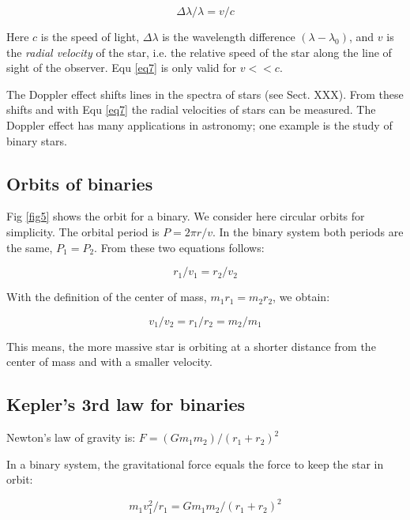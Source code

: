 \begin{equation}
\Delta\lambda / \lambda = v/c
\label{eq7}
\end{equation}

Here $c$ is the speed of light, $\Delta\lambda$ is the wavelength difference $(\lambda - \lambda_0)$, and $v$ is the \textit{radial velocity} of the star, i.e. the relative speed of the star along the line of sight of the observer. Equ \eqref{eq7} is only valid for $v<<c$.

The Doppler effect shifts lines in the spectra of stars (see Sect. XXX). From these shifts and with Equ \eqref{eq7} the radial velocities of stars can be measured. The Doppler effect has many applications in astronomy; one example is the study of binary stars.

\subsection{Orbits of binaries}

Fig \ref{fig5} shows the orbit for a binary. We consider here circular orbits for simplicity. The orbital period is $P = 2 \pi r / v$. In the binary system both periods are the same, $P_1 = P_2$. From these two equations follows:

\begin{equation}
r_1 / v_1 = r_2 / v_2
\label{eq8}
\end{equation}

With the definition of the center of mass, $m_1 r_1 = m_2 r_2$, we obtain:

\begin{equation}
v_1 / v_2 = r_1 / r_2 = m_2 / m_1
\label{eq9}
\end{equation}

This means, the more massive star is orbiting at a shorter distance from the center of mass and with a smaller velocity.

\subsection{Kepler's 3rd law for binaries}

Newton's law of gravity is: $F = (G m_1 m_2) / (r_1 + r_2)^2$

In a binary system, the gravitational force equals the force to keep the star in orbit: 

\begin{equation}
m_1 v_1^2 / r_1 = G m_1 m_2 / (r_1 + r_2)^2
\label{eq10}
\end{equation}

